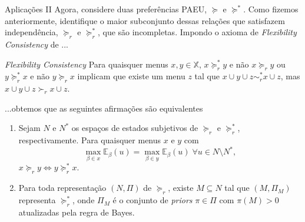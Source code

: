 \documentclass[11pt]{beamer}
\theoremstyle{nonumberplain}
\theoremstyle{plain}
\begin{document}
\begin{frame}{Aplicações II}
Agora, considere duas preferências PAEU, $\succcurlyeq$ e $\succcurlyeq^*$. Como fizemos anteriormente, identifique o maior subconjunto dessas relações que satisfazem independência, $\succcurlyeq_r$ e $\succcurlyeq^*_r$, que são incompletas. Impondo o axioma de \emph{Flexibility Consistency} de \cite{Moura2013}...
\begin{block}{\emph{Flexibility Consistency}}
Para quaisquer menus $x,y\in \mathbb{X}$, $x\succcurlyeq^*_r y$ e não $x\succcurlyeq_r y$ ou $y\succcurlyeq^*_r x$ e não $y\succcurlyeq_r x$ implicam que existe um menu $z$ tal que $x\cup y\cup z \sim^*_r x\cup z$, mas $x\cup y\cup z \succ_r x\cup z$.
\end{block} 
\end{frame}

\begin{frame}
...obtemos que as seguintes afirmações são equivalentes
\begin{enumerate}[1.]
\item Sejam $N$ e $N^*$ os espaços de estados subjetivos de $\succcurlyeq_r$ e $\succcurlyeq^*_r$, respectivamente. Para quaisquer menus $x$ e $y$ com 
$$\max_{\beta\in x}\mathbb{E}_\beta(u) = \max_{\beta\in y}\mathbb{E}_\beta(u)\;\forall u\in N\setminus N^*,$$
$x\succcurlyeq_r y \Leftrightarrow y\succcurlyeq^*_r x$.
\item Para toda representação $(N,\Pi)$ de $\succcurlyeq_r$, existe $M\subseteq N$ tal que $(M,\Pi_M)$ representa $\succcurlyeq_r^*$, onde $\Pi_M$ é o conjunto de \emph{priors} $\pi\in \Pi$ com $\pi(M)>0$ atualizadas pela regra de Bayes.
\end{enumerate} 
\end{frame}

\begin{frame}
\scriptsize


\end{frame}
\end{document}
